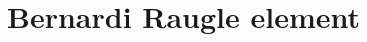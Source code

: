 \documentclass[smallextended]{svjour3}       %
\begin{document}
\section{Bernardi Raugle element}
\end{document}
